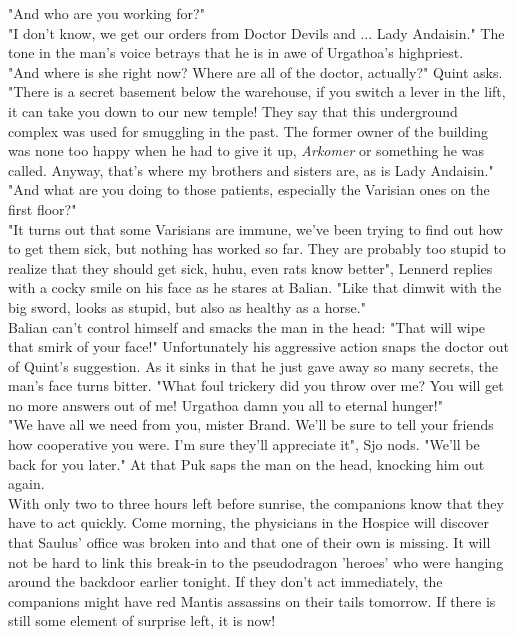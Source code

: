 "And who are you working for?"\\

"I don't know, we get our orders from Doctor Devils and ... Lady Andaisin." The tone in the man's voice betrays that he is in awe of Urgathoa's highpriest.\\

"And where is she right now? Where are all of the doctor, actually?" Quint asks.\\

"There is a secret basement below the warehouse, if you switch a lever in the lift, it can take you down to our new temple! They say that this underground complex was used for smuggling in the past. The former owner of the building was none too happy when he had to give it up, {\itshape Arkomer} or something he was called. Anyway, that's where my brothers and sisters are, as is Lady Andaisin." "And what are you doing to those patients, especially the Varisian ones on the first floor?"\\

"It turns out that some Varisians are immune, we've been trying to find out how to get them sick, but nothing has worked so far. They are probably too stupid to realize that they should get sick, huhu, even rats know better", Lennerd replies with a cocky smile on his face as he stares at Balian. "Like that dimwit with the big sword, looks as stupid, but also as healthy as a horse."\\

Balian can't control himself and smacks the man in the head: "That will wipe that smirk of your face!" Unfortunately his aggressive action snaps the doctor out of Quint's suggestion. As it sinks in that he just gave away so many secrets, the man's face turns bitter. "What foul trickery did you throw over me? You will get no more answers out of me! Urgathoa damn you all to eternal hunger!"\\

"We have all we need from you, mister Brand. We'll be sure to tell your friends how cooperative you were. I'm sure they'll appreciate it", Sjo nods. "We'll be back for you later." At that Puk saps the man on the head, knocking him out again.\\

With only two to three hours left before sunrise, the companions know that they have to act quickly. Come morning, the physicians in the Hospice will discover that Saulus' office was broken into and that one of their own is missing. It will not be hard to link this break-in to the pseudodragon 'heroes' who were hanging around the backdoor earlier tonight. If they don't act immediately, the companions might have red Mantis assassins on their tails tomorrow. If there is still some element of surprise left, it is now!\\

